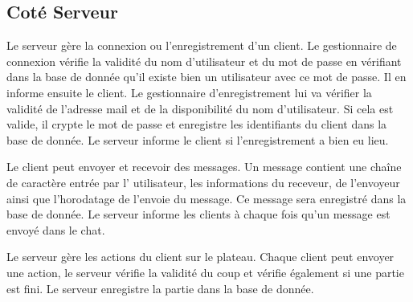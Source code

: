 \subsection{Coté Serveur}


Le serveur gère la connexion ou l'enregistrement d'un client. 
Le gestionnaire de connexion vérifie la validité du nom d'utilisateur et
du mot de passe en vérifiant dans la base de donnée qu'il existe bien un utilisateur avec ce mot de passe. Il en informe ensuite le client.
Le gestionnaire d'enregistrement lui va vérifier la validité de l'adresse mail et de la disponibilité du nom d'utilisateur. Si cela est valide, il crypte le mot de passe et enregistre les identifiants du client dans la base de donnée. Le serveur informe le client si l'enregistrement a bien eu lieu.

Le client peut envoyer et recevoir des messages.
Un message contient une chaîne de caractère entrée par l' utilisateur, les informations du receveur, de l'envoyeur ainsi que l'horodatage de l'envoie du message. Ce message sera enregistré dans la base de donnée. Le serveur informe les clients à chaque fois qu'un message est envoyé dans le chat.

Le serveur gère les actions du client sur le plateau.
Chaque client peut envoyer une action, le serveur vérifie la validité du coup et vérifie également si une partie est fini. Le serveur enregistre la partie dans la base de donnée.

